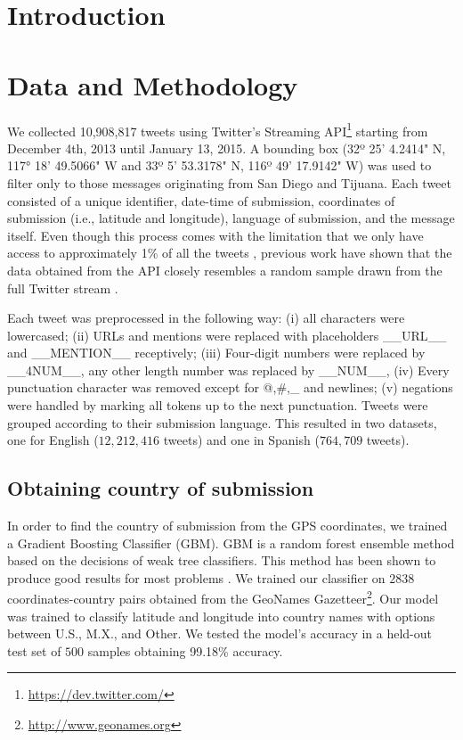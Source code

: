\documentclass[11pt]{article}
\title{}
\author{}
\date{\today}
\begin{document}
\maketitle

\begin{abstract}

\end{abstract}

\section{Introduction}


\section{Data and Methodology}
We collected 10,908,817 tweets using Twitter's Streaming API\footnote{\url{https://dev.twitter.com/}} starting from December 4th, 2013 until January 13, 2015. A bounding box (32º 25' 4.2414" N, 117° 18' 49.5066" W and 33º 5' 53.3178" N, 116º 49' 17.9142" W) was used to filter only to those messages originating from San Diego and Tijuana. Each tweet consisted of a unique identifier, date-time of submission, coordinates of submission (i.e., latitude and longitude), language of submission, and the message itself. Even though this process comes with the limitation that we only have access to approximately 1\% of all the tweets \cite{Olteanu2015}, previous work have shown that the data obtained from the API closely resembles a random sample drawn from the full Twitter stream \cite{DBLP:journals/corr/MorstatterPLC13}.

Each tweet was preprocessed in the following way: (i) all characters were lowercased; (ii) URLs and mentions were replaced with placeholders \_\_URL\_\_ and \_\_MENTION\_\_ receptively; (iii) Four-digit numbers were replaced by \_\_4NUM\_\_, any other length number was replaced by \_\_NUM\_\_, (iv) Every punctuation character  was removed except for @,\#,\_ and newlines; (v) negations were handled by marking all tokens up to the next punctuation. Tweets were grouped according to their submission language. This resulted in two datasets, one for English ($12,212,416$ tweets) and one in Spanish ($764,709$ tweets). 

\subsection{Obtaining country of submission}
In order to find the country of submission from the GPS coordinates, we trained a Gradient Boosting Classifier (GBM). GBM is a random forest ensemble method based on the decisions of weak tree classifiers. This method has been shown to produce good results for most problems \cite{JMLR:v15:delgado14a}. We trained our classifier on $2838$ coordinates-country pairs obtained from the GeoNames Gazetteer\footnote{\url{http://www.geonames.org}}. Our model was trained to classify latitude and longitude into country names with options between U.S., M.X., and Other. We tested the model's accuracy in a held-out test set of $500$ samples obtaining 99.18\% accuracy.
\end{document}
